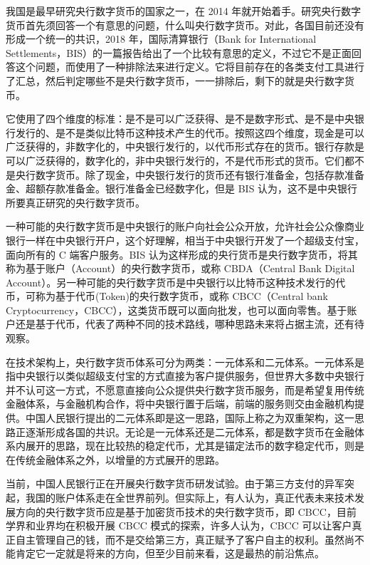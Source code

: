 \documentclass{article}
\begin{document}
\begin{itemize}
我国是最早研究央行数字货币的国家之一，在 2014 年就开始着手。研究央行数字货币首先须回答一个有意思的问题，什么叫央行数字货币。对此，各国目前还没有形成一个统一的共识，2018 年，国际清算银行（Bank for International Settlements，BIS）的一篇报告给出了一个比较有意思的定义，不过它不是正面回答这个问题，而使用了一种排除法来进行定义。它将目前存在的各类支付工具进行了汇总，然后判定哪些不是央行数字货币，一一排除后，剩下的就是央行数字货币。\par

它使用了四个维度的标准：是不是可以广泛获得、是不是数字形式、是不是中央银行发行的、是不是类似比特币这种技术产生的代币。按照这四个维度，现金是可以广泛获得的，非数字化的，中央银行发行的，以代币形式存在的货币。银行存款是可以广泛获得的，数字化的，非中央银行发行的，不是代币形式的货币。它们都不是央行数字货币。除了现金，中央银行发行的货币还有银行准备金，包括存款准备金、超额存款准备金。银行准备金已经数字化，但是 BIS 认为，这不是中央银行所要真正研究的央行数字货币。\par

一种可能的央行数字货币是中央银行的账户向社会公众开放，允许社会公众像商业银行一样在中央银行开户，这个好理解，相当于中央银行开发了一个超级支付宝，面向所有的 C 端客户服务。BIS 认为这样形成的央行货币是央行数字货币，将其称为基于账户（Account）的央行数字货币，或称 CBDA（Central Bank Digital Account）。另一种可能的央行数字货币是中央银行以比特币这种技术发行的代币，可称为基于代币(Token)的央行数字货币，或称 CBCC（Central bank Cryptocurrency，CBCC），这类货币既可以面向批发，也可以面向零售。基于账户还是基于代币，代表了两种不同的技术路线，哪种思路未来将占据主流，还有待观察。\par

在技术架构上，央行数字货币体系可分为两类：一元体系和二元体系。一元体系是指中央银行以类似超级支付宝的方式直接为客户提供服务，但世界大多数中央银行并不认可这一方式，不愿意直接向公众提供央行数字货币服务，而是希望复用传统金融体系，与金融机构合作，将中央银行置于后端，前端的服务则交由金融机构提供。中国人民银行提出的二元体系即是这一思路，国际上称之为双重架构，这一思路正逐渐形成各国的共识。无论是一元体系还是二元体系，都是数字货币在金融体系内展开的思路，现在比较热的稳定代币，尤其是锚定法币的数字稳定代币，则是在传统金融体系之外，以增量的方式展开的思路。\par

当前，中国人民银行正在开展央行数字货币研发试验。由于第三方支付的异军突起，我国的账户体系走在全世界前列。但实际上，有人认为，真正代表未来技术发展方向的央行数字货币应是基于加密货币技术的央行数字货币，即 CBCC，目前学界和业界均在积极开展 CBCC 模式的探索，许多人认为，CBCC 可以让客户真正自主管理自己的钱，而不是交给第三方，真正赋予了客户自主的权利。虽然尚不能肯定它一定就是将来的方向，但至少目前来看，这是最热的前沿焦点。\par
\end{itemize}
\end{document}
